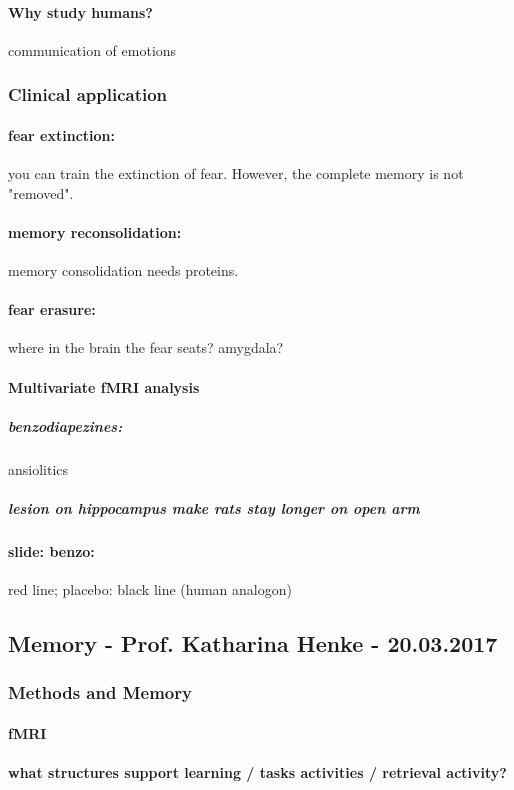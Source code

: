\documentclass[12pt,article,oneside,a4paper]{memoir}
\begin{document}
\paragraph{Why study humans?} communication of emotions

\subsubsection{Clinical application}
\paragraph{fear extinction:} you can train the extinction of fear. However, the complete memory is not "removed".
\paragraph{memory reconsolidation:} memory consolidation needs proteins.
\paragraph{fear erasure:} where in the brain the fear seats? amygdala?

\paragraph{Multivariate fMRI analysis}
\subparagraph{benzodiapezines:} ansiolitics
\subparagraph{lesion on hippocampus make rats stay longer on open arm}
\paragraph{slide: benzo:} red line; placebo: black line (human analogon)

\subsection{Memory - Prof. Katharina Henke - 20.03.2017}
\subsubsection{Methods and Memory}
\paragraph{fMRI}
\paragraph{what structures support learning / tasks activities / retrieval activity?}
\end{document}
